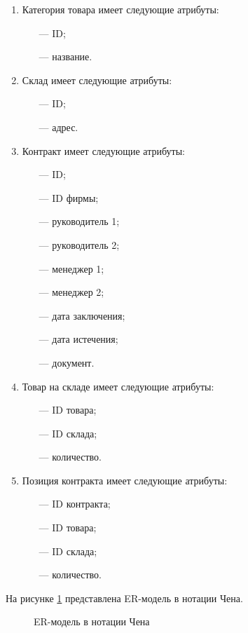 \begin{enumerate}
	\item Категория товара имеет следующие атрибуты: 
	\begin{itemize}
		\item[---] ID;
		\item[---] название.
	\end{itemize}
	
	\item Склад имеет следующие атрибуты: 
	\begin{itemize}
		\item[---] ID;
		\item[---] адрес.
	\end{itemize}
	
	\item Контракт имеет следующие атрибуты: 
	\begin{itemize}
		\item[---] ID;
		\item[---] ID фирмы;
		\item[---] руководитель 1;
		\item[---] руководитель 2;
		\item[---] менеджер 1;
		\item[---] менеджер 2;
		\item[---] дата заключения;
		\item[---] дата истечения;
		\item[---] документ.
	\end{itemize}
\newpage
	\item Товар на складе имеет следующие атрибуты: 
	\begin{itemize}
		\item[---] ID товара;
		\item[---] ID склада;
		\item[---] количество. 
	\end{itemize}
	
	\item Позиция контракта имеет следующие атрибуты: 
	\begin{itemize}
		\item[---] ID контракта;
		\item[---] ID товара;
		\item[---] ID склада;
		\item[---] количество. 
	\end{itemize}
\end{enumerate}

На рисунке \ref{er_model} представлена ER-модель в нотации Чена.
\begin{figure}[h!]
	\center{}
	\caption{ER-модель в нотации Чена}
	\label{er_model}
\end{figure}

